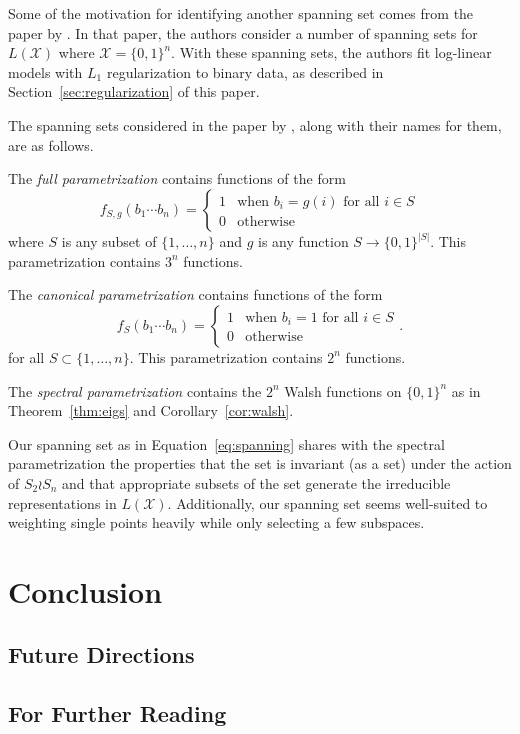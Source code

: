 \documentclass[cclicense]{hmcthesis}
\providecommand*{\xs}{\mathcal X}
\numberwithin{equation}{chapter}
\numberwithin{thmcounter}{chapter}
\begin{document}
    Some of the motivation for identifying another spanning set comes from the
    paper by \citet{SPEC}.  In that paper, the authors consider a number of
    spanning sets for $L(\xs)$ where $\xs = \{0, 1\}^n$.  With these spanning
    sets, the authors fit log-linear models with $L_1$ regularization to binary
    data, as described in Section~\ref{sec:regularization} of this paper.

    The spanning sets considered in the paper by \citet{SPEC}, along with their
    names for them, are as follows.

    The \emph{full parametrization} contains functions of the form
    \[
        f_{S, g}(b_1 \cdots b_n) = \begin{cases}
            1 & \text{when $b_i = g(i)$ for all $i \in S$} \\
            0 & \text{otherwise}
        \end{cases}
    \]
    where $S$ is any subset of $\{1, \ldots, n\}$ and $g$ is any function $S \to
    \{0, 1\}^{|S|}$.  This parametrization contains $3^n$ functions.

    The \emph{canonical parametrization} contains functions of the form
    \[
        f_S(b_1 \cdots b_n) = \begin{cases}
            1 & \text{when $b_i = 1$ for all $i \in S$} \\
            0 & \text{otherwise}
        \end{cases}.
    \]
    for all $S \subset \{1, \ldots, n\}$.  This parametrization contains $2^n$
    functions.

    The \emph{spectral parametrization} contains the $2^n$ Walsh functions on
    $\{0, 1\}^n$ as in Theorem~\ref{thm:eigs} and Corollary~\ref{cor:walsh}.

    Our spanning set as in Equation~\ref{eq:spanning} shares with the spectral
    parametrization the properties that the set is invariant (as a set) under
    the action of $S_2 \wr S_n$ and that appropriate subsets of the set generate
    the irreducible representations in $L(\xs)$.  Additionally, our spanning set
    seems well-suited to weighting single points heavily while only selecting a
    few subspaces.

\chapter{Conclusion}

\section{Future Directions}

\section{For Further Reading}


\appendix




\backmatter




\end{document}
